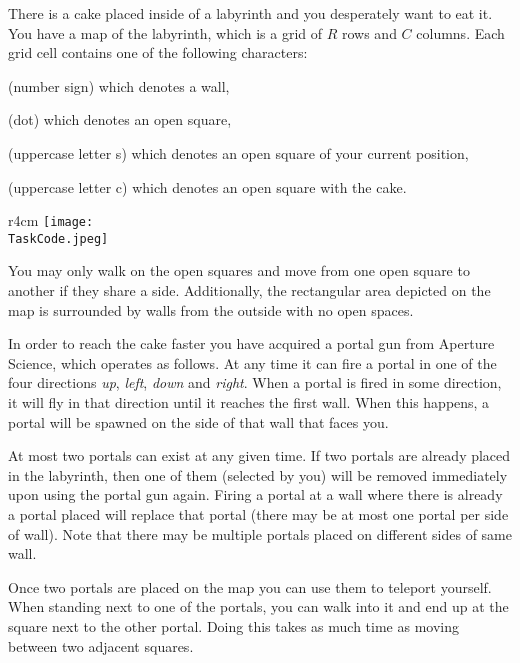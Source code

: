 \documentclass{boi2014}
\renewcommand{\TaskCode}{portals}
\newcommand{\constant}[1]{{\tt #1}}
\begin{document}
    There is a cake placed inside of a labyrinth and you desperately want to eat
    it. You have a map of the labyrinth, which is a grid of $R$ rows and $C$
    columns.  Each grid cell contains one of the following characters:
    \begin{description}[itemindent=1pt]
    	\item[\constant{\#}] (number sign) which denotes a wall,
        \item[\constant{.}] (dot) which denotes an open square,
        \item[\constant{S}] (uppercase letter s) which denotes an open square of
        your current position,
        \item[\constant{C}] (uppercase letter c) which denotes an open square
        with the cake.
    \end{description}

    \begin{wrapfigure}{r}{4cm}
		\texttt{[image: \\TaskCode.jpeg]}
	\end{wrapfigure}

    You may only walk on the open squares and move from one open square to
    another if they share a side. Additionally, the rectangular area depicted on
    the map is surrounded by walls from the outside with no open spaces.

    In order to reach the cake faster you have acquired a portal gun from
    Aperture Science\texttrademark{}, which operates as follows.
    At any time it can fire a portal in one of the four directions
    \emph{up}, \emph{left}, \emph{down} and \emph{right}.
    When a portal is fired in some direction, it will fly in that direction
    until it reaches the first wall. When this happens, a portal
    will be spawned on the side of that wall that faces you.

    At most two portals can exist at any given time. If two portals are already
    placed in the labyrinth, then one of them (selected by you) will be removed
    immediately upon using the portal gun again. Firing a portal at a wall where
    there is already a portal placed will replace that portal (there may be at
    most one portal per side of wall).  Note that there may be multiple portals
    placed on different sides of same wall.

    Once two portals are placed on the map you can use them to
    teleport yourself. When standing next to one of the portals,
    you can walk into it and end up at the square next to the other
    portal. Doing this takes as much time as moving between two
    adjacent squares.
\end{document}
